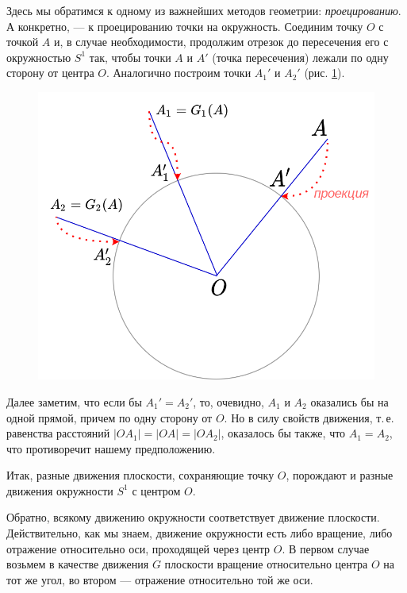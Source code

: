 \begin{enumerate}
Здесь мы обратимся к одному из важнейших методов геометрии: \textit{проецированию}. А конкретно, --- к проецированию точки на окружность. Соединим точку $O$ с точкой $A$ и, в случае необходимости, продолжим отрезок до пересечения его с окружностью $S^1$ так, чтобы точки $A$ и $A'$ (точка пересечения) лежали по одну сторону от центра $O$. Аналогично построим точки $A_1'$ и $A_2'$ (рис. \ref{projection}).

\begin{figure}[hbt!]
\begin{center}
\includegraphics[scale=0.3]{projection.png}
\end{center}\caption{}\label{projection}
\end{figure}

Далее заметим, что если бы $A_1'=A_2'$, то, очевидно, $A_1$ и $A_2$ оказались бы на одной прямой, причем по одну сторону от $O$. Но в силу свойств движения, т.\,е. равенства расстояний $|OA_1|=|OA|=|OA_2|$, оказалось бы также, что $A_1=A_2$, что противоречит нашему предположению.

Итак, разные движения плоскости, сохраняющие точку $O$, порождают и разные движения окружности $S^1$ с центром $O$.

Обратно, всякому движению окружности соответствует движение плоскости. Действительно, как мы знаем, движение окружности есть либо вращение, либо отражение относительно оси, проходящей через центр $O$. В первом случае возьмем в качестве движения $G$ плоскости вращение относительно центра $O$ на тот же угол, во втором --- отражение относительно той же оси.


\end{enumerate}
